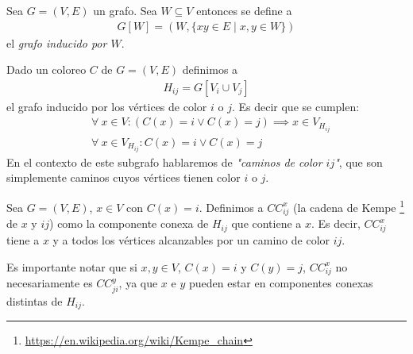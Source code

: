 \begin{comment}
\begin{proposition}\label{graph_cyclic_color}
  Un grafo cíclico $C_n$ con $n \ge 2$ es bipartito si $n$ es par y es
  $3$-coloreable si $n$ es impar. Es decir,
\begin{align}
    \chi(C_n) = 
    \begin{cases}
                2 & |\ \text{n es par} \\
                3 & |\ \text{n es impar}
    \end{cases}
\end{align}
\end{proposition}

\begin{proof}
  Visto en clase.
\end{proof}
\end{comment}

\begin{definition}
  Sea $G = (V, E)$ un grafo. Sea $W \subseteq V$ entonces se define a
  \begin{align}
    G[W] = \left(W, \{xy \in E \mid x,y \in W\}\right)
  \end{align}
  el \emph{grafo inducido por $W$}.
\end{definition}

\begin{definition}
Dado un coloreo $C$ de $G = (V,E)$ definimos a
\begin{align}
    H_{ij} = G\left[V_i \cup V_j\right]
\end{align}
el grafo inducido por los vértices de color $i$ o $j$.
Es decir que se cumplen:
\begin{align}
    &\forall~ x \in V \colon (C(x) = i \vee C(x) = j) \implies x \in V_{H_{ij}}\\
    &\forall~ x \in V_{H_{ij}} \colon C(x) = i \vee C(x) = j
\end{align}
En el contexto de este subgrafo hablaremos de \emph{"caminos de color $ij$"}, que son simplemente caminos cuyos vértices tienen color $i$ o $j$.
\end{definition}

\begin{definition}
Sea $G = (V, E)$, $x \in V$ con $C(x) = i$. Definimos a $CC^x_{ij}$ (la cadena de Kempe \footnote{\url{https://en.wikipedia.org/wiki/Kempe_chain}} de $x$ y $ij$) como la componente conexa de $H_{ij}$ que contiene a $x$.
Es decir, $CC^x_{ij}$ tiene a $x$ y a todos los vértices alcanzables por un camino de color $ij$.

Es importante notar que si $x,y \in V$, $C(x) = i$ y $C(y) = j$, $CC^x_{ij}$ no necesariamente es $CC^y_{ji}$, ya que $x$ e $y$ pueden estar en componentes conexas distintas de $H_{ij}$.
\end{definition}

